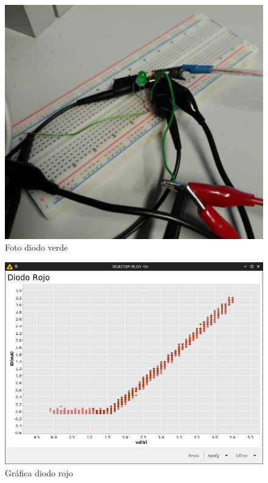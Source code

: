 \documentclass[paper=a4, fontsize=11pt]{scrartcl} %
\numberwithin{equation}{section} %
\numberwithin{figure}{section} %
\numberwithin{table}{section} %
\begin{document}
\begin{itemize}
	\begin{figure}[H]
		\centering
		\includegraphics[scale=0.4]{image/foto-diodo-verde}
		\caption{Foto diodo verde}
		\label{fig:foto-diodo-verde}
	\end{figure}
	
	\begin{figure}[H]
		\centering
		\includegraphics[scale=0.4]{image/diodo-rojo}
		\caption{Gráfica diodo rojo}
		\label{fig:grafica-diodo-rojo}
	\end{figure}
	

\end{itemize}
\end{document}
